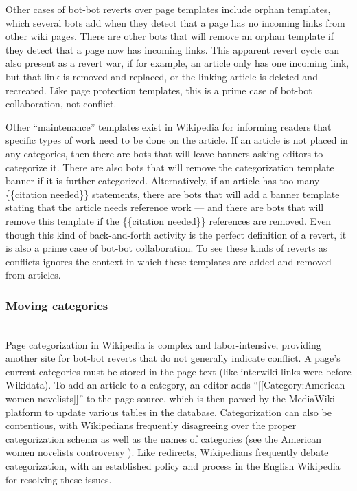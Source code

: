 \documentclass[format=acmsmall, review=false, screen=true]{acmart}%
\begin{document}
Other cases of bot-bot reverts over page templates include orphan templates, which several bots add when they detect that a page has no incoming links from other wiki pages. There are other bots that will remove an orphan template if they detect that a page now has incoming links. This apparent revert cycle can also present as a revert war, if for example, an article only has one incoming link, but that link is removed and replaced, or the linking article is deleted and recreated. Like page protection templates, this is a prime case of bot-bot collaboration, not conflict.  

Other ``maintenance'' templates exist in Wikipedia for informing readers that specific types of work need to be done on the article. If an article is not placed in any categories, then there are bots that will leave banners asking editors to categorize it. There are also bots that will remove the categorization template banner if it is further categorized. Alternatively, if an article has too many  \{\{citation needed\}\} statements, there are bots that will add a banner template stating that the article needs reference work --- and there are bots that will remove this template if the  \{\{citation needed\}\} references are removed. Even though this kind of back-and-forth activity is the perfect definition of a revert, it is also a prime case of bot-bot collaboration. To see these kinds of reverts as conflicts ignores the context in which these templates are added and removed from articles.

\subsubsection{Moving categories}  
~\\
Page categorization in Wikipedia is complex and labor-intensive, providing another site for bot-bot reverts that do not generally indicate conflict. A page's current categories must be stored in the page text (like interwiki links were before Wikidata). To add an article to a category, an editor adds ``[[Category:American women novelists]]'' to the page source, which is then parsed by the MediaWiki platform to update various tables in the database. Categorization can also be contentious, with Wikipedians frequently disagreeing over the proper categorization schema as well as the names of categories (see the American women novelists controversy \cite{Filipacchi2013}). Like redirects, Wikipedians frequently debate categorization, with an established policy and process in the English Wikipedia for resolving these issues. 
\end{document}
